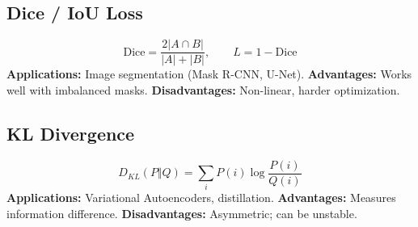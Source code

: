 \documentclass[11pt]{article}
\begin{document}
\subsection{Dice / IoU Loss}
\[
\mathrm{Dice} = \frac{2|A \cap B|}{|A| + |B|}, \qquad
L = 1 - \mathrm{Dice}
\]
\textbf{Applications:} Image segmentation (Mask R-CNN, U-Net).  
\textbf{Advantages:} Works well with imbalanced masks.  
\textbf{Disadvantages:} Non-linear, harder optimization.

\subsection{KL Divergence}
\[
D_{KL}(P\Vert Q) = \sum_i P(i)\log\frac{P(i)}{Q(i)}
\]
\textbf{Applications:} Variational Autoencoders, distillation.  
\textbf{Advantages:} Measures information difference.  
\textbf{Disadvantages:} Asymmetric; can be unstable.

\setlength{\tabcolsep}{4pt} %
\end{document}
